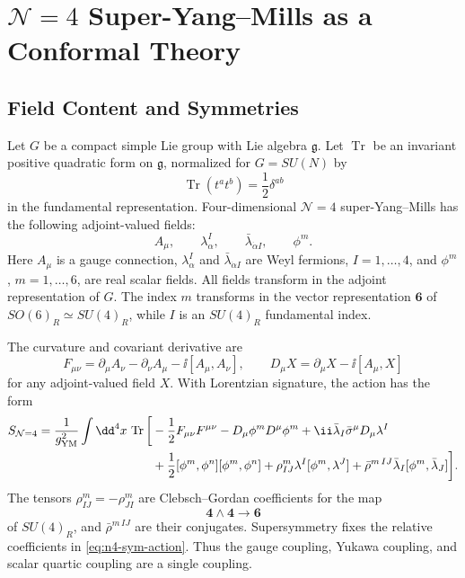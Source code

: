\chapter{\texorpdfstring{\(\mathcal N=4\)}{N=4} Super-Yang--Mills as a Conformal Theory}
\label{ch:volume-iii-n4-super-yang-mills-conformal-theory}

\section{Field Content and Symmetries}

Let \(G\) be a compact simple Lie group with Lie algebra \(\mathfrak g\).
Let \(\operatorname{Tr}\) be an invariant positive quadratic form on
\(\mathfrak g\), normalized for \(G=SU(N)\) by
\[
  \operatorname{Tr}(t^at^b)=\frac12\delta^{ab}
\]
in the fundamental representation.  Four-dimensional
\(\mathcal N=4\) super-Yang--Mills has the following adjoint-valued fields:
\[
  A_\mu,\qquad
  \lambda^I_\alpha,\qquad
  \bar\lambda_{\dot\alpha I},\qquad
  \phi^m.
\]
Here \(A_\mu\) is a gauge connection, \(\lambda^I_\alpha\) and
\(\bar\lambda_{\dot\alpha I}\) are Weyl fermions, \(I=1,\ldots,4\), and
\(\phi^m\), \(m=1,\ldots,6\), are real scalar fields.  All fields transform in
the adjoint representation of \(G\).  The index \(m\) transforms in the vector
representation \(\mathbf6\) of \(SO(6)_R\simeq SU(4)_R\), while \(I\) is an
\(SU(4)_R\) fundamental index.

The curvature and covariant derivative are
\[
  F_{\mu\nu}
  =
  \partial_\mu A_\nu-\partial_\nu A_\mu-\ii[A_\mu,A_\nu],
  \qquad
  D_\mu X=\partial_\mu X-\ii[A_\mu,X]
\]
for any adjoint-valued field \(X\).  With Lorentzian signature, the action has
the form
\begin{equation}
\begin{aligned}
  S_{\mathcal N=4}
  =
  \frac1{g_{\rm YM}^2}\int\dd^4x\,\operatorname{Tr}\bigg[
  &-\frac12F_{\mu\nu}F^{\mu\nu}
  -D_\mu\phi^mD^\mu\phi^m
  +\ii\bar\lambda_I\bar\sigma^\mu D_\mu\lambda^I\\
  &+\frac12[\phi^m,\phi^n][\phi^m,\phi^n]
  +\rho^m_{IJ}\lambda^I[\phi^m,\lambda^J]
  +\bar\rho^{m\,IJ}\bar\lambda_I[\phi^m,\bar\lambda_J]
  \bigg].
\end{aligned}
  \label{eq:n4-sym-action}
\end{equation}
The tensors \(\rho^m_{IJ}=-\rho^m_{JI}\) are Clebsch--Gordan coefficients for
the map
\[
  \mathbf4\wedge\mathbf4\longrightarrow\mathbf6
\]
of \(SU(4)_R\), and \(\bar\rho^{m\,IJ}\) are their conjugates.  Supersymmetry
fixes the relative coefficients in \eqref{eq:n4-sym-action}.  Thus the gauge
coupling, Yukawa coupling, and scalar quartic coupling are a single coupling.

